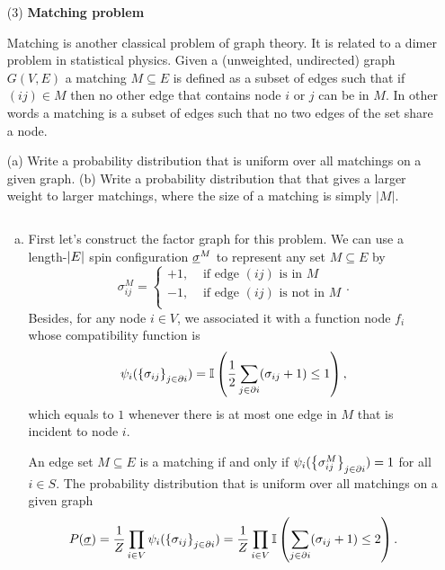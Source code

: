 \documentclass[a4paper,oneside,12pt]{article}
\begin{document}
\begin{itemize}
\item[(3)]{\bf Matching problem}

    Matching is another classical problem of graph theory. It is related
    to a dimer problem in statistical physics. Given a  (unweighted,
    undirected) graph $G(V,E)$ a
    matching $M \subseteq E$ is defined as a subset of edges such that if $(ij) \in M$ then
    no other edge that contains node $i$ or $j$ can be in $M$. In other
    words a matching is a subset of edges such that no two edges of the
    set share a node. 


    (a) Write a probability distribution that is uniform over all
    matchings on a given graph. (b) Write a probability distribution
    that that gives a larger weight to larger matchings, where the
    size of a matching is simply $|M|$. 

    \begin{solution} $\,$ 
    \begin{enumerate}[(a)]
    \item   
            First let's construct the factor graph for this problem.
            We can use a length-$ \left| E \right| $ spin configuration $ \underline{\sigma}^M $ to represent any set $ M \subseteq E $ by
            \begin{equation*}
                \sigma_{ij}^M = 
                \begin{cases}
                    +1, &\text{ if edge } (ij) \text{ is in } M\\
                    -1, &\text{ if edge } (ij) \text{ is not in } M\\
                \end{cases}.
            \end{equation*}
            Besides, for any node $ i \in V $, we associated it with a function node $ f_i $ whose compatibility function is
            \begin{equation*}
                \psi_i(\left\lbrace  \sigma_{ij}  \right\rbrace_{j \in \partial i}) = \mathbb{I} \left(  \frac{1}{2} \sum_{j \in \partial i} (\sigma_{ij}+1) \le 1  \right),
            \end{equation*}
            which equals to $ 1 $ whenever there is at most one edge in $ M $ that is incident to node $ i $.

            An edge set $ M \subseteq E $ is a matching if and only if $ \psi_i(\left\lbrace  \sigma_{ij}^M  \right\rbrace_{j \in \partial i}) = 1 $ for all $ i \in S $.
            The probability distribution that is uniform over all matchings on a given graph
            \begin{equation}\label{eq:3_1}
                P(\underline{\sigma})
                = \frac{1}{Z} \prod_{i \in V} \psi_i(\left\lbrace  \sigma_{ij}  \right\rbrace_{j \in \partial i})
                = \frac{1}{Z} \prod_{i \in V} \mathbb{I} \left(  \sum_{j \in \partial i} (\sigma_{ij}+1) \le 2  \right).
            \end{equation}


\end{enumerate}
\end{solution}
\end{itemize}
\end{document}
